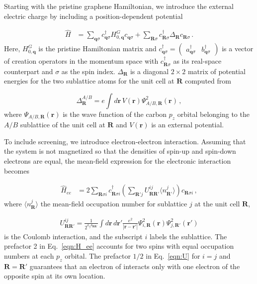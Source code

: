 \documentclass[aps, prb, superscriptaddress, preprint, floatfix]{revtex4-1}
\begin{document}
Starting with the pristine graphene Hamiltonian, we introduce the external electric charge by including a position-dependent potential

%
\begin{align}
    \hat{H} &= \sum_{\mathbf{q}\sigma} c^\dagger_{\mathbf{q}\sigma}
    H_{0,\mathbf{q}}^G 
    c_{\mathbf{q}\sigma}
    +\sum_{\mathbf{R}\sigma} c_{\mathbf{R}\sigma}^\dagger \Delta_{\mathbf{R}} c_{\mathbf{R}\sigma}
    \,.
    \label{eqn:H_0}
\end{align}
%
Here, $H_{0,\mathbf{q}}^G$ is the pristine Hamiltonian matrix and $c_{\mathbf{q}\sigma}^\dagger = \begin{pmatrix} a_{\mathbf{q}\sigma}^\dagger&b_{\mathbf{q}\sigma}^\dagger
\end{pmatrix}$ is a vector of creation operators in the momentum space with $c_{\mathbf{R}\sigma}^\dagger$ as its real-space counterpart and $\sigma$ as the spin index. $\Delta_{\mathbf{R}}$ is a diagonal $2\times 2$ matrix of potential energies for the two sublattice atoms for the unit cell at $\mathbf{R}$ computed from

%
\begin{equation}
    \Delta_\mathbf{R}^{A/B} = e\int d\mathbf{r} \,V(\mathbf{r}) \Psi_{A/B,\mathbf{R}}^2(\mathbf{r})\,,
\end{equation}
%
where $\Psi_{A/B,\mathbf{R}}(\mathbf{r})$ is the wave function of the carbon $p_z$ orbital belonging to the $A/B$ sublattice of the unit cell at $\mathbf{R}$ and $V(\mathbf{r})$ is an external potential.

To include screening, we introduce electron-electron interaction. Assuming that the system is not magnetized so that the densities of spin-up and spin-down electrons are equal, the mean-field expression for the electronic interaction becomes

%
\begin{align}
    \hat{H}_{ee} &= 
    2\sum_{\mathbf{R}\sigma i}
    c^\dagger_{\mathbf{R}\sigma i} 
    \left(\sum_{\mathbf{R}'j}
    U_{\mathbf{RR}'}^{ij}
    \langle n_{\mathbf{R}'}^j\rangle
    \right)
    c_{\mathbf{R}\sigma i} \,,
    \label{eqn:H_ee}
\end{align}
%
where $\langle n_\mathbf{R}^j\rangle$ the mean-field occupation number for sublattice $j$ at the unit cell $\mathbf{R}$, 

%
\begin{align}
    U_{\mathbf{R}\mathbf{{R}'}}^{ij} = 
    \frac{1}{2^{\delta_{ij}\delta_{\mathbf{RR}'}}}
    \int d\mathbf{r}\, d\mathbf{r}' \frac{e^2}{|\mathbf{r} - \mathbf{r}'|}
    \Psi_{i,\mathbf{R}}^2(\mathbf{r})
    \Psi_{j,\mathbf{R}'}^2(\mathbf{r}')
    \label{eqn:U}
\end{align}
%
is the Coulomb interaction, and the subscript $i$ labels the sublattice. The prefactor 2 in Eq.~\eqref{eqn:H_ee} accounts for two spins with equal occupation numbers at each $p_z$ orbital. The prefactor $1/2$ in Eq.~\eqref{eqn:U} for $i = j$ and $\mathbf{R} = \mathbf{R}'$ guarantees that an electron of interacts only with one electron of the opposite spin at its own location.
\end{document}
